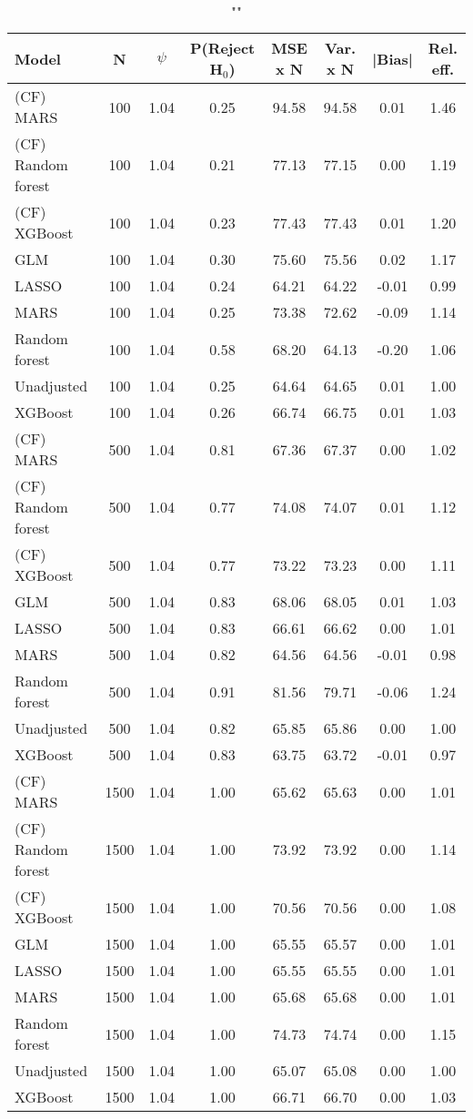 \begin{table}
\centering
\caption{""}
\begin{tabular}{lccccccc}
\toprule
Model & N & $\psi$ & P(Reject H$_0$) & MSE x N & Var. x N & |Bias| & Rel. eff.\\ \midrule
(CF) MARS & 100 & 1.04 & 0.25 & 94.58 & 94.58 &  0.01 & 1.46 \\ 
(CF) Random forest & 100 & 1.04 & 0.21 & 77.13 & 77.15 &  0.00 & 1.19 \\ 
(CF) XGBoost & 100 & 1.04 & 0.23 & 77.43 & 77.43 &  0.01 & 1.20 \\ 
GLM & 100 & 1.04 & 0.30 & 75.60 & 75.56 &  0.02 & 1.17 \\ 
LASSO & 100 & 1.04 & 0.24 & 64.21 & 64.22 & -0.01 & 0.99 \\ 
MARS & 100 & 1.04 & 0.25 & 73.38 & 72.62 & -0.09 & 1.14 \\ 
Random forest & 100 & 1.04 & 0.58 & 68.20 & 64.13 & -0.20 & 1.06 \\ 
Unadjusted & 100 & 1.04 & 0.25 & 64.64 & 64.65 &  0.01 & 1.00 \\ 
XGBoost & 100 & 1.04 & 0.26 & 66.74 & 66.75 &  0.01 & 1.03 \\ \addlinespace 
(CF) MARS & 500 & 1.04 & 0.81 & 67.36 & 67.37 &  0.00 & 1.02 \\ 
(CF) Random forest & 500 & 1.04 & 0.77 & 74.08 & 74.07 &  0.01 & 1.12 \\ 
(CF) XGBoost & 500 & 1.04 & 0.77 & 73.22 & 73.23 &  0.00 & 1.11 \\ 
GLM & 500 & 1.04 & 0.83 & 68.06 & 68.05 &  0.01 & 1.03 \\ 
LASSO & 500 & 1.04 & 0.83 & 66.61 & 66.62 &  0.00 & 1.01 \\ 
MARS & 500 & 1.04 & 0.82 & 64.56 & 64.56 & -0.01 & 0.98 \\ 
Random forest & 500 & 1.04 & 0.91 & 81.56 & 79.71 & -0.06 & 1.24 \\ 
Unadjusted & 500 & 1.04 & 0.82 & 65.85 & 65.86 &  0.00 & 1.00 \\ 
XGBoost & 500 & 1.04 & 0.83 & 63.75 & 63.72 & -0.01 & 0.97 \\ \addlinespace 
(CF) MARS & 1500 & 1.04 & 1.00 & 65.62 & 65.63 &  0.00 & 1.01 \\ 
(CF) Random forest & 1500 & 1.04 & 1.00 & 73.92 & 73.92 &  0.00 & 1.14 \\ 
(CF) XGBoost & 1500 & 1.04 & 1.00 & 70.56 & 70.56 &  0.00 & 1.08 \\ 
GLM & 1500 & 1.04 & 1.00 & 65.55 & 65.57 &  0.00 & 1.01 \\ 
LASSO & 1500 & 1.04 & 1.00 & 65.55 & 65.55 &  0.00 & 1.01 \\ 
MARS & 1500 & 1.04 & 1.00 & 65.68 & 65.68 &  0.00 & 1.01 \\ 
Random forest & 1500 & 1.04 & 1.00 & 74.73 & 74.74 &  0.00 & 1.15 \\ 
Unadjusted & 1500 & 1.04 & 1.00 & 65.07 & 65.08 &  0.00 & 1.00 \\ 
XGBoost & 1500 & 1.04 & 1.00 & 66.71 & 66.70 &  0.00 & 1.03 \\
\bottomrule
\end{tabular}
\end{table}

